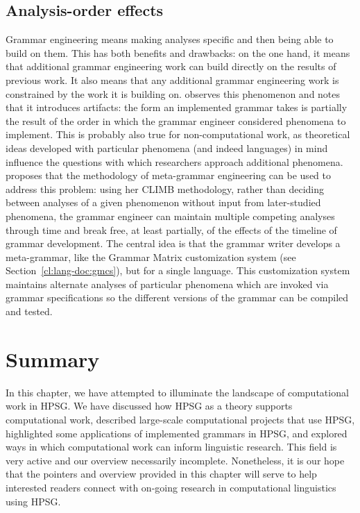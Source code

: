 \documentclass[output=paper,nonflat]{langsci/langscibook}
\begin{document}
\subsection{Analysis-order effects}
Grammar engineering means making analyses
specific and then being able to build on them. This has both benefits
and drawbacks: on the one hand, it means that additional grammar
engineering work can build directly on the results of previous
work. It also means that any additional grammar engineering work is
constrained by the work it is building on.  \cite{Fokkens:14} observes
this phenomenon and notes that it introduces artifacts: the form an
implemented grammar takes is partially the result of the order in
which the grammar engineer considered phenomena to implement. This is
probably also true for non-computational work, as theoretical ideas
developed with particular phenomena (and indeed languages) in mind
influence the questions with which researchers approach additional
phenomena. \citeauthor{Fokkens:14} proposes that the methodology of
meta-grammar engineering can be used to address this problem: using
her CLIMB methodology, rather than deciding between analyses of a
given phenomenon without input from later-studied phenomena, the
grammar engineer can maintain multiple competing analyses through time
and break free, at least partially, of the effects of the timeline of
grammar development. The central idea is that the grammar writer develops
a meta-grammar, like the Grammar Matrix customization system (see Section~\ref{cl:lang-doc:gmcs}),
but for a single language. This customization system maintains
alternate analyses of particular phenomena which are invoked via grammar
specifications so the different versions of the grammar can be compiled
and tested.


\section{Summary}

In this chapter, we have attempted to illuminate the landscape of
computational work in HPSG. We have discussed how HPSG as a theory
supports computational work, described large-scale computational
projects that use HPSG, highlighted some applications of implemented
grammars in HPSG, and explored ways in which computational work can
inform linguistic research. This field is very active and our overview
necessarily incomplete. Nonetheless, it is our hope that the pointers
and overview provided in this chapter will serve to help interested readers
connect with on-going research in computational linguistics using HPSG.
\end{document}
